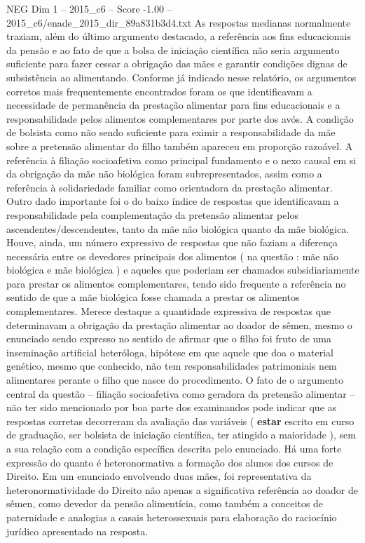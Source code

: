 \begin{textsample}{NEG Dim 1 – 2015\_c6 – Score -1.00 – 2015\_c6/enade\_2015\_dir\_89a831b3d4.txt}
As respostas medianas normalmente traziam, além do último argumento destacado, a referência aos fins educacionais da pensão e ao fato de que a bolsa de iniciação científica não seria argumento suficiente para fazer cessar a obrigação das mães e garantir condições dignas de subsistência ao alimentando.
Conforme já indicado nesse relatório, os argumentos corretos mais frequentemente encontrados foram os que identificavam a necessidade de permanência da prestação alimentar para fins educacionais e a responsabilidade pelos alimentos complementares por parte dos avós.
A condição de bolsista como não sendo suficiente para eximir a responsabilidade da mãe sobre a pretensão alimentar do filho também apareceu em proporção razoável.
A referência à filiação socioafetiva como principal fundamento e o nexo causal em si da obrigação da mãe não biológica foram subrepresentados, assim como a referência à solidariedade familiar como orientadora da prestação alimentar.
Outro dado importante foi o do baixo índice de respostas que identificavam a responsabilidade pela complementação da pretensão alimentar pelos ascendentes/descendentes, tanto da mãe não biológica quanto da mãe biológica.
Houve, ainda, um número expressivo de respostas que não faziam a diferença necessária entre os devedores principais dos alimentos ( na questão : mãe não biológica e mãe biológica ) e aqueles que poderiam ser chamados subsidiariamente para prestar os alimentos complementares, tendo sido frequente a referência no sentido de que a mãe biológica fosse chamada a prestar os alimentos complementares.
Merece destaque a quantidade expressiva de respostas que determinavam a obrigação da prestação alimentar ao doador de sêmen, mesmo o enunciado sendo expresso no sentido de afirmar que o filho foi fruto de uma inseminação artificial heteróloga, hipótese em que aquele que doa o material genético, mesmo que conhecido, não tem responsabilidades patrimoniais nem alimentares perante o filho que nasce do procedimento.
O fato de o argumento central da questão – filiação socioafetiva como geradora da pretensão alimentar – não ter sido mencionado por boa parte dos examinandos pode indicar que as respostas corretas decorreram da avaliação das variáveis ( \textbf{estar} escrito em curso de graduação, ser bolsista de iniciação científica, ter atingido a maioridade ), sem a sua relação com a condição específica descrita pelo enunciado.
Há uma forte expressão do quanto é heteronormativa a formação dos alunos dos cursos de Direito.
Em um enunciado envolvendo duas mães, foi representativa da heteronormatividade do Direito não apenas a significativa referência ao doador de sêmen, como devedor da pensão alimentícia, como também a conceitos de paternidade e analogias a casais heterossexuais para elaboração do raciocínio jurídico apresentado na resposta.

\end{textsample}
